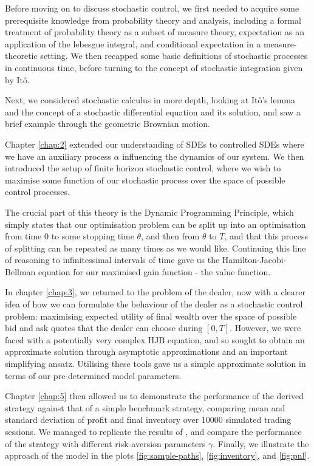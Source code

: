 Before moving on to discuss stochastic control, we first needed to acquire some 
prerequisite knowledge from probability theory and analysis, including a formal 
treatment of probability theory as a subset of measure theory, expectation as an
application of the lebesgue integral, and conditional expectation in a measure-theoretic
setting. We then recapped some basic definitions of stochastic processes in continuous
time, before turning to the concept of stochastic integration given by It\^{o}.

Next, we considered stochastic calculus in more depth, looking at It\^{o}'s lemma 
and the concept of a stochastic differential equation and its solution, and saw a brief 
example through the geometric Brownian motion.

Chapter \ref{chap:2} extended our understanding of SDEs to controlled SDEs where we 
have an auxiliary process $\alpha$ influencing the dynamics of our system. We then 
introduced the setup of finite horizon stochastic control, where we wish to maximise 
some function of our stochastic process over the space of possible control processes.

The crucial part of this theory is the Dynamic Programming Principle, which simply states
that our optimisation problem can be split up into an optimisation from time 0 to 
some stopping time $\theta$, and then from $\theta$ to $T$, and that this process of 
splitting can be repeated as many times as we would like. Continuing this line of reasoning
to infinitessimal intervals of time gave us the Hamilton-Jacobi-Bellman equation for 
our maximised gain function - the value function.

In chapter \ref{chap:3}, we returned to the problem of the dealer, now with a clearer 
idea of how we can formulate the behaviour of the dealer as a stochastic control problem:
maximising expected utility of final wealth over the space of possible bid and ask quotes
that the dealer can choose during $[0,T]$. However, we were faced with a potentially 
very complex HJB equation, and so sought to obtain an approximate solution through 
asymptotic approximations and an important simplifying ansatz. Utilising these tools 
gave us a simple approximate solution in terms of our pre-determined model parameters.

Chapter \ref{chap:5} then allowed us to demonstrate the performance of the derived 
strategy against that of a simple benchmark strategy, comparing mean and standard 
deviation of profit and final inventory over 10000 simulated trading sessions. We 
managed to replicate the results of \cite{AS2008}, and compare the performance of the 
strategy with different risk-aversion parameters $\gamma$. Finally, we illustrate 
the approach of the model in the plots \ref{fig:sample-paths}, \ref{fig:inventory},
and \ref{fig:pnl}.
